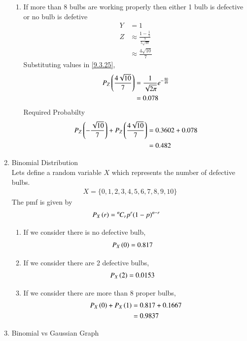 \documentclass[journal,12pt,onecolumn]{IEEEtran}
\theoremstyle{remark}
\begin{document}
\begin{enumerate}[label=(\roman*)]
\begin{enumerate}[label=(\alph*)]
\item If more than 8 bulbs are working properly then either 1 bulb is defective or no bulb is defetive  
\begin{align}
	Y &= 1\\
	Z &\approx \frac{1 - \frac{1}{5}}{\frac{7}{5\sqrt{10}}}\\
	  &\approx \frac{4\sqrt{10}}{7}
\end{align}
Substituting values in \eqref{9.3.25},
\begin{align}
P_Z\left(\frac{4\sqrt{10}}{7}\right) &= \frac{1}{\sqrt{2\pi}} e^{-\frac{80}{49}}\\
			      &= 0.078
\end{align}
Required Probabilty 
\begin{align}
P_Z\left(-\frac{\sqrt{10}}{7}\right) + P_Z\left(\frac{4\sqrt{10}}{7}\right) &= 0.3602 + 0.078\\ 
								&= 0.482
\end{align}
\end{enumerate}
\item Binomial Distribution\\
Lets define a random variable $X$ which represents the number of defective bulbs.
\begin{align}
X = \{0,1,2,3,4,5,6,7,8,9,10\}
\end{align}
The pmf is given by 
\begin{align} 
P_X\left(r\right) &= {{}^{n}\mkern-1muC_{r}} p^{r}(1-p)^{n-r}
\end{align}
\begin{enumerate}[label=(\alph*)]
\item If we consider there is no defective bulb, 
\begin{align}
P_X\left(0\right) &= 0.817
\end{align}
\item If we consider there are 2 defective bulbs, 
\begin{align}
P_X\left(2\right) &= 0.0153
\end{align}
\item If we consider there are more than 8 proper bulbs, 
\begin{align}
P_X\left(0\right) + P_X\left(1\right)  &= 0.817 + 0.1667\\
			   &= 0.9837
\end{align}
\end{enumerate}
\item Binomial vs Gaussian Graph\\

\end{enumerate}
\end{document}
